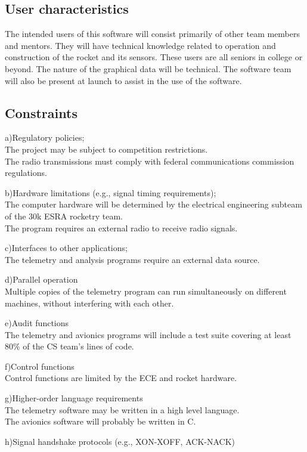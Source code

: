 \documentclass[onecolumn, draftclsnofoot, 10pt, compsoc]{IEEEtran}
\begin{document}
\subsection{User characteristics}
The intended users of this software will consist primarily of other team members and mentors. They will have technical knowledge related to operation and construction of the rocket and its sensors. These users are all seniors in college or beyond. The nature of the graphical data will be technical. The software team will also be present at launch to assist in the use of the software.

\subsection{Constraints}
a)Regulatory policies;\\
The project may be subject to competition restrictions.\\
The radio transmissions must comply with federal communications commission regulations.

b)Hardware limitations (e.g., signal timing requirements);\\
The computer hardware will be determined by the electrical engineering subteam of the 30k ESRA rocketry team.\\
The program requires an external radio to receive radio signals.

c)Interfaces to other applications;\\
The telemetry and analysis programs require an external data source.

d)Parallel operation\\
Multiple copies of the telemetry program can run simultaneously on different machines, without interfering with each other.

e)Audit functions\\
The telemetry and avionics programs will include a test suite covering at least 80\% of the CS team’s lines of code.

f)Control functions\\
Control functions are limited by the ECE and rocket hardware.

g)Higher-order language requirements\\
The telemetry software may be written in a high level language.\\
The avionics software will probably be written in C.

h)Signal handshake protocols (e.g., XON-XOFF, ACK-NACK)
\end{document}
